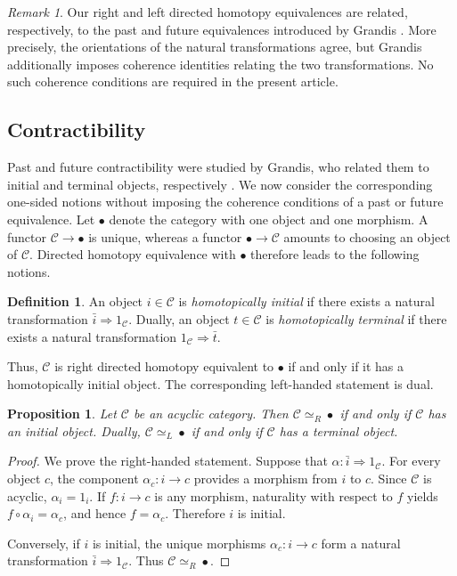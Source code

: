 \documentclass[12pt]{amsart}
\newtheorem{prop}[teo]{Proposition}
\theoremstyle{definition}
\newtheorem{definition}[teo]{Definition}
\theoremstyle{remark}
\newtheorem{remark}{Remark}
\numberwithin{figure}{section}%
\newcommand{\CC}{\mathcal{C}}
\begin{document}
\begin{remark}
Our right and left directed homotopy equivalences are related,
respectively, to the past and future equivalences introduced by Grandis
\cite[Section~2]{GrandisShape}. More precisely, the orientations of the
natural transformations agree, but Grandis additionally imposes coherence
identities relating the two transformations. No such coherence conditions
are required in the present article.
\end{remark}

\subsection{Contractibility}\label{subsec:cont}

Past and future contractibility were studied by Grandis, who related them
to initial and terminal objects, respectively
\cite[Section~2.6]{GrandisShape}. We now consider the corresponding
one-sided notions without imposing the coherence conditions of a past or
future equivalence. Let \(\bullet\) denote the category with one object and one morphism. A
functor \(\CC\to\bullet\) is unique, whereas a functor
\(\bullet\to\CC\) amounts to choosing an object of \(\CC\). Directed
homotopy equivalence with \(\bullet\) therefore leads to the following
notions.

\begin{definition}\label{def:homotopically_initial_terminal}
An object \(i\in\CC\) is \emph{homotopically initial} if there exists a
natural transformation \(\bar{i}\Rightarrow1_\CC\). Dually, an object
\(t\in\CC\) is \emph{homotopically terminal} if there exists a natural
transformation \(1_\CC\Rightarrow\bar{t}\).
\end{definition}

Thus, \(\CC\) is right directed homotopy equivalent to \(\bullet\) if and
only if it has a homotopically initial object. The corresponding left-handed
statement is dual.

\begin{prop}\label{prop:acyclic_directed_contractibility}
Let \(\CC\) be an acyclic category. Then \(\CC\simeq_R\bullet\) if and
only if \(\CC\) has an initial object. Dually,
\(\CC\simeq_L\bullet\) if and only if \(\CC\) has a terminal object.
\end{prop}

\begin{proof}
We prove the right-handed statement. Suppose that
\(\alpha\colon\bar{i}\Rightarrow1_\CC\). For every object \(c\), the
component \(\alpha_c\colon i\to c\) provides a morphism from \(i\) to \(c\).
Since \(\CC\) is acyclic, \(\alpha_i=1_i\). If \(f\colon i\to c\) is any morphism, naturality with respect to \(f\) yields
\(f\circ\alpha_i=\alpha_c\), and hence \(f=\alpha_c\). Therefore \(i\) is
initial.

Conversely, if \(i\) is initial, the unique morphisms
\(\alpha_c\colon i\to c\) form a natural transformation
\(\bar{i}\Rightarrow1_\CC\). Thus \(\CC\simeq_R\bullet\).
\end{proof}
\end{document}

